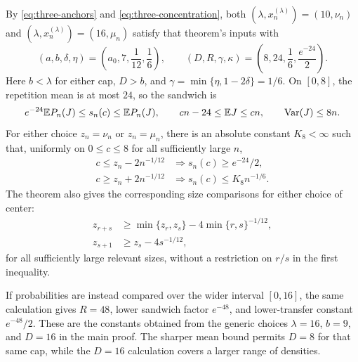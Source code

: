 By \eqref{eq:three-anchors} and \eqref{eq:three-concentration}, both
\((\lambda,x_n^{(\lambda)})=(10,\nu_n)\) and
\((\lambda,x_n^{(\lambda)})=(16,\mu_n)\) satisfy that theorem's inputs
with
\begin{equation}\label{eq:three-engine-parameters}
 (a,b,\delta,\eta)=\left(a_0,7,\frac1{12},\frac16\right),\qquad
 (D,R,\gamma,\kappa)=\left(8,24,\frac16,\frac{e^{-24}}2\right).
\end{equation}
Here \(b<\lambda\) for either cap, \(D>b\), and
\(\gamma=\min\{\eta,1-2\delta\}=1/6\).
On \([0,8]\), the repetition mean is at most \(24\), so the sandwich is
\begin{equation}\label{eq:three-poisson-sandwich}
 e^{-24}\mathbb E P_n(J)\le s_n(c)\le\mathbb E P_n(J),\qquad
 cn-24\le\mathbb E J\le cn,\qquad \operatorname{Var}(J)\le8n.
\end{equation}
For either choice \(z_n=\nu_n\) or \(z_n=\mu_n\), there is an absolute
constant \(K_8<\infty\) such that, uniformly on \(0\le c\le8\) for all
sufficiently large \(n\),
\begin{align}
 c\le z_n-2n^{-1/12}&\Longrightarrow s_n(c)\ge e^{-24}/2,
       \label{eq:three-transfer-low}\\
 c\ge z_n+2n^{-1/12}&\Longrightarrow s_n(c)\le K_8n^{-1/6}.
       \label{eq:three-transfer-high}
\end{align}
The theorem also gives the corresponding size comparisons for either
choice of center:
\begin{align}
 z_{r+s}&\ge\min\{z_r,z_s\}-4\min\{r,s\}^{-1/12},
       \label{eq:three-center-sum}\\
 z_{s+1}&\ge z_s-4s^{-1/12},
       \label{eq:three-neighbor}
\end{align}
for all sufficiently large relevant sizes, without a restriction on
\(r/s\) in the first inequality.

If probabilities are instead compared over the wider interval
\([0,16]\), the same calculation gives \(R=48\), lower sandwich factor
\(e^{-48}\), and lower-transfer constant \(e^{-48}/2\). These are the
constants obtained from the generic choices \(\lambda=16\), \(b=9\),
and \(D=16\) in the main proof. The sharper mean bound permits \(D=8\)
for that same cap, while the \(D=16\) calculation covers a larger range
of densities.
